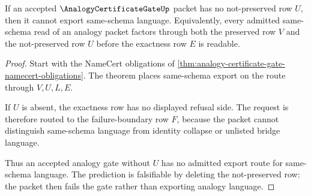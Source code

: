 \begin{theorem}
\label{thm:analogy-certificate-gate-falsifiable-prediction}
If an accepted $\AnalogyCertificateGateUp$ packet has no not-preserved row $U$, then it cannot export same-schema language. Equivalently, every admitted same-schema read of an analogy packet factors through both the preserved row $V$ and the not-preserved row $U$ before the exactness row $E$ is readable.
\end{theorem}
\begin{proof}
Start with the NameCert obligations of \autoref{thm:analogy-certificate-gate-namecert-obligations}. The theorem places same-schema export on the route through $V,U,L,E$.

If $U$ is absent, the exactness row has no displayed refusal side. The request is therefore routed to the failure-boundary row $F$, because the packet cannot distinguish same-schema language from identity collapse or unlisted bridge language.

Thus an accepted analogy gate without $U$ has no admitted export route for same-schema language. The prediction is falsifiable by deleting the not-preserved row: the packet then fails the gate rather than exporting analogy language.
\end{proof}

